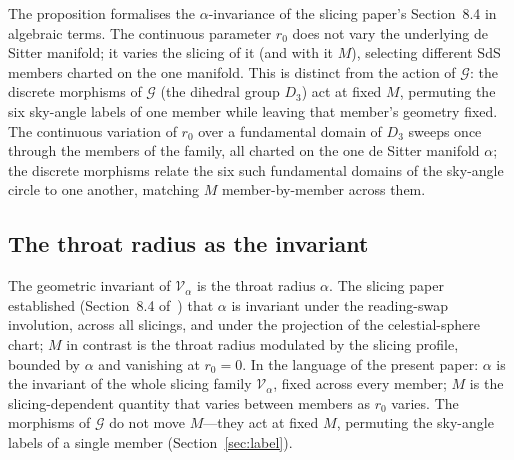 \documentclass[11pt,a4paper]{article}
\theoremstyle{definition}
\begin{document}
The proposition formalises the $\alpha$-invariance of the slicing paper's Section~8.4 in algebraic terms. The continuous parameter $r_{0}$ does not vary the underlying de Sitter manifold; it varies the slicing of it (and with it $M$), selecting different SdS members charted on the one manifold. This is distinct from the action of $\mathcal{G}$: the discrete morphisms of $\mathcal{G}$ (the dihedral group $D_{3}$) act at fixed $M$, permuting the six sky-angle labels of one member while leaving that member's geometry fixed. The continuous variation of $r_{0}$ over a fundamental domain of $D_{3}$ sweeps once through the members of the family, all charted on the one de Sitter manifold $\alpha$; the discrete morphisms relate the six such fundamental domains of the sky-angle circle to one another, matching $M$ member-by-member across them.

\subsection{The throat radius as the invariant}\label{sec:alpha-invariant}

The geometric invariant of $\mathcal{V}_{\alpha}$ is the throat radius $\alpha$. The slicing paper established (Section~8.4 of~\cite{JanzenSlicing}) that $\alpha$ is invariant under the reading-swap involution, across all slicings, and under the projection of the celestial-sphere chart; $M$ in contrast is the throat radius modulated by the slicing profile, bounded by $\alpha$ and vanishing at $r_{0}=0$. In the language of the present paper: $\alpha$ is the invariant of the whole slicing family $\mathcal{V}_{\alpha}$, fixed across every member; $M$ is the slicing-dependent quantity that varies between members as $r_{0}$ varies. The morphisms of $\mathcal{G}$ do not move $M$---they act at fixed $M$, permuting the sky-angle labels of a single member (Section~\ref{sec:label}).
\end{document}
